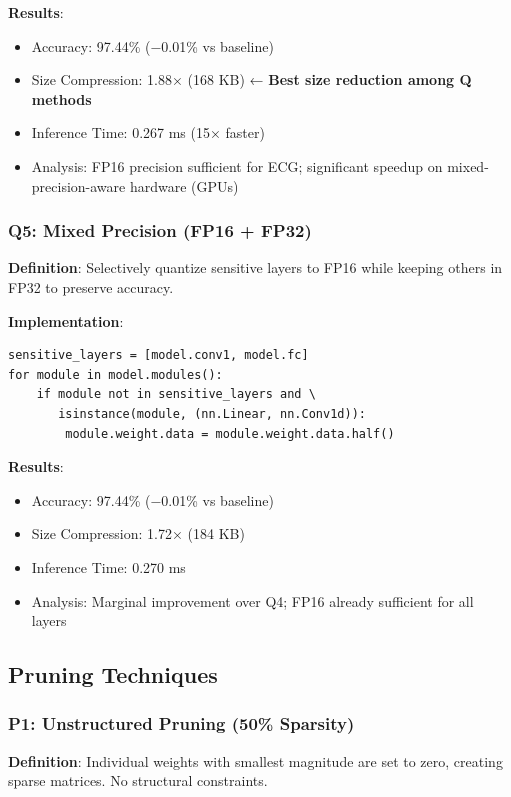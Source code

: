 \documentclass[12pt, a4paper]{article}
\begin{document}
\textbf{Results}:
\begin{itemize}
    \item Accuracy: 97.44\% (−0.01\% vs baseline)
    \item Size Compression: 1.88× (168 KB) ← \textbf{Best size reduction among Q methods}
    \item Inference Time: 0.267 ms (15× faster)
    \item Analysis: FP16 precision sufficient for ECG; significant speedup on mixed-precision-aware hardware (GPUs)
\end{itemize}

\subsubsection{Q5: Mixed Precision (FP16 + FP32)}

\textbf{Definition}: Selectively quantize sensitive layers to FP16 while keeping others in FP32 to preserve accuracy.

\textbf{Implementation}:
\begin{lstlisting}
sensitive_layers = [model.conv1, model.fc]
for module in model.modules():
    if module not in sensitive_layers and \
       isinstance(module, (nn.Linear, nn.Conv1d)):
        module.weight.data = module.weight.data.half()
\end{lstlisting}

\textbf{Results}:
\begin{itemize}
    \item Accuracy: 97.44\% (−0.01\% vs baseline)
    \item Size Compression: 1.72× (184 KB)
    \item Inference Time: 0.270 ms
    \item Analysis: Marginal improvement over Q4; FP16 already sufficient for all layers
\end{itemize}

\subsection{Pruning Techniques}

\subsubsection{P1: Unstructured Pruning (50\% Sparsity)}

\textbf{Definition}: Individual weights with smallest magnitude are set to zero, creating sparse matrices. No structural constraints.
\end{document}
